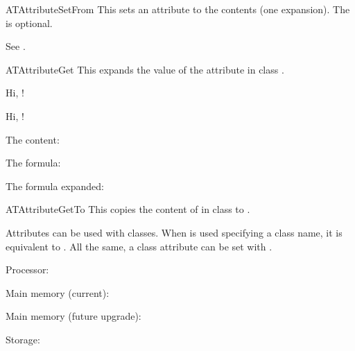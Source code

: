 \documentclass[a4paper, 11pt]{article}
\begin{document}
\begin{Macrodef}{ATAttributeSetFrom}{}{}
    This sets an attribute  to the contents  (one expansion). The  is optional.

    See .
\end{Macrodef}

\begin{Macrodef}{ATAttributeGet}{}{}
    This expands the value of the attribute  in class .
\end{Macrodef}

\begin{PDExample}
    Hi, !

    Hi, !
\end{PDExample}

\begin{PDExample}
    \edef\formula{\ATAttributeGet{equation}}
    The content: \meaning\content\par
    The formula: \meaning\formula\par
    The formula expanded: \expandafter\meaning\formula
\end{PDExample}

\begin{Macrodef}{ATAttributeGetTo}{}{}
    This copies the content of  in class  to .
\end{Macrodef}



Attributes can be used with classes. When  is used specifying a class name, it is equivalent to . All the same, a class attribute can be set with .

\begin{PDExample}
    Processor: \par
    Main memory (current): \par
    Main memory (future upgrade): \par
    Storage: \par
\end{PDExample}
\end{document}
